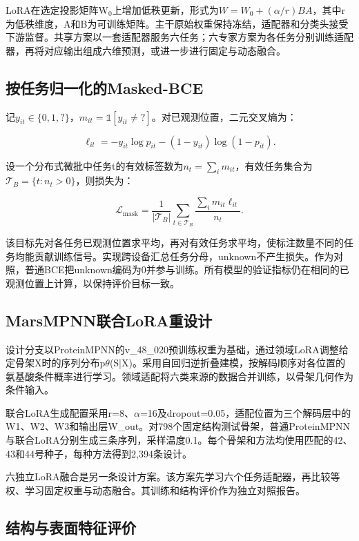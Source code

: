 \documentclass[conference]{IEEEtran}
\begin{document}
LoRA在选定投影矩阵W$_0$上增加低秩更新，形式为$W=W_0+(\alpha/r)BA$，其中r为低秩维度，A和B为可训练矩阵。主干原始权重保持冻结，适配器和分类头接受下游监督。共享方案以一套适配器服务六任务；六专家方案为各任务分别训练适配器，再将对应输出组成六维预测，或进一步进行固定与动态融合。

\subsection{按任务归一化的Masked-BCE}

记$y_{it}\in\{0,1,?\}$，$m_{it}=\mathbb{1}[y_{it}\ne ?]$。对已观测位置，二元交叉熵为：

\begin{equation}\ell_{it}=-y_{it}\log p_{it}-(1-y_{it})\log(1-p_{it}).\end{equation}

设一个分布式微批中任务t的有效标签数为$n_t=\sum_i m_{it}$，有效任务集合为$\mathcal{T}_B=\{t:n_t>0\}$，则损失为：

\begin{equation}\mathcal{L}_{\mathrm{mask}}=\frac{1}{|\mathcal{T}_B|}\sum_{t\in\mathcal{T}_B}\frac{\sum_i m_{it}\ell_{it}}{n_t}.\end{equation}

该目标先对各任务已观测位置求平均，再对有效任务求平均，使标注数量不同的任务均能贡献训练信号。实现跨设备汇总任务分母，unknown不产生损失。作为对照，普通BCE把unknown编码为0并参与训练。所有模型的验证指标仍在相同的已观测位置上计算，以保持评价目标一致。

\subsection{MarsMPNN联合LoRA重设计}

设计分支以ProteinMPNN的v\_48\_020预训练权重为基础，通过领域LoRA调整给定骨架X时的序列分布p$\theta$(S|X)。采用自回归逆折叠建模，按解码顺序对各位置的氨基酸条件概率进行学习。领域适配将六类来源的数据合并训练，以骨架几何作为条件输入。

联合LoRA生成配置采用r=8、$\alpha$=16及dropout=0.05，适配位置为三个解码层中的W1、W2、W3和输出层W\_out。对798个固定结构测试骨架，普通ProteinMPNN与联合LoRA分别生成三条序列，采样温度0.1。每个骨架和方法均使用匹配的42、43和44号种子，每种方法得到2,394条设计。

六独立LoRA融合是另一条设计方案。该方案先学习六个任务适配器，再比较等权、学习固定权重与动态融合。其训练和结构评价作为独立对照报告。

\subsection{结构与表面特征评价}
\end{document}
